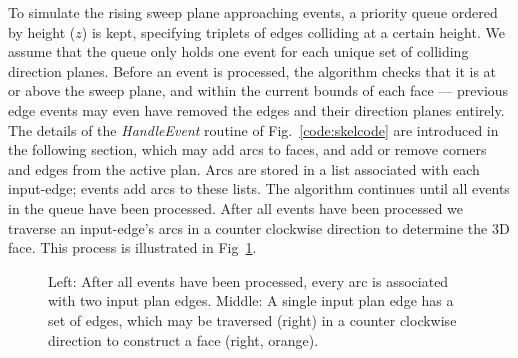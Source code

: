 To simulate the rising sweep plane approaching events, a priority queue ordered by height ($z$) is kept, specifying triplets of edges colliding at a certain height. We assume that the queue only holds one event for each unique set of colliding direction planes.
Before an event is processed, the algorithm checks that it is at or above the sweep plane, and within the current bounds of each face --- previous edge events may even have removed the edges and their direction planes entirely.
The details of the \emph{HandleEvent} routine of Fig.~\ref{code:skelcode} are introduced in the following section, which may add arcs to faces, and add or remove corners and edges from the active plan.  Arcs are stored in a list associated with each input-edge; events add arcs to these lists. The algorithm continues until all events in the queue have been processed. After all events have been processed we traverse an input-edge's arcs in a counter clockwise direction to determine the 3D face. This process is illustrated in Fig~\ref{fig:skel_reconstruct_faces}.

\begin{figure}
  \centering
  \def\svgwidth{1.0\columnwidth}
  
  \caption[Reconstructing skeleton faces]{\label{fig:skel_reconstruct_faces}Left: After all events have been processed, every arc is associated with two input plan edges. Middle: A single input plan edge has a set of edges, which may be traversed (right) in a counter clockwise direction to construct a face (right, orange).}
\end{figure}


